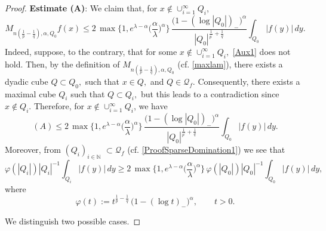 \documentclass[11pt, a4paper,leqno]{amsart}
\theoremstyle{plain}
\numberwithin{equation}{section}
\theoremstyle{definition}
\theoremstyle{remark}
\begin{document}
\begin{proof}
\vspace{2mm} \textbf{Estimate (A)}: We claim that, for $x\not \in \cup
_{i=1}^{\infty}Q_{i}$,
\begin{equation}
M_{n(\frac{1}{p}-\frac{1}{q}),\alpha,Q_{0}}f(x) \leq2\, \max\bigg\{1,
e^{\lambda- \alpha} \bigg(\frac{\alpha}{\lambda} \bigg)^{\alpha}\bigg\} \,
\frac{\big( 1 - (\log|Q_{0}|)_{-} \big)^{\alpha}}{|Q_{0}|^{\frac{1}{p^{\prime
}}+\frac{1}{q}}}\int_{Q_{0}}|f(y)|\,dy. \label{Aux1}%
\end{equation}
Indeed, suppose, to the contrary, that for some $x\not \in \cup_{i=1}^{\infty
}Q_{i},$ \eqref{Aux1} does not hold. Then, by the definition of $M_{n(\frac
{1}{p}-\frac{1}{q}),\alpha,Q_{0}}$ (cf. \eqref{maxlam}), there exists a dyadic
cube $Q\subset Q_{0},$ such that $x\in Q,$ and $Q\in\mathcal{Q}_{f}.$
Consequently, there exists a maximal cube $Q_{i}$ such that $Q\subset Q_{i},$
but this leads to a contradiction since $x\notin Q_{i}.$ Therefore, for
$x\not \in \cup_{i=1}^{\infty}Q_{i}$, we have
\begin{equation*}
(A)\leq2\, \max\bigg\{1, e^{\lambda- \alpha} \bigg(\frac{\alpha}{\lambda}
\bigg)^{\alpha}\bigg\} \, \frac{\big( 1 - (\log|Q_{0}|)_{-} \big)^{\alpha}%
}{|Q_{0}|^{\frac{1}{p^{\prime}}+\frac{1}{q}}}\int_{Q_{0}}|f(y)|\,dy.
\end{equation*}
Moreover, from $(Q_{i})_{i\in\mathbb{N}}$ $\subset\mathcal{Q}_{f}$ (cf.
\eqref{ProofSparseDomination1}) we see that%
\begin{equation}
\label{hshash}\varphi(|Q_{i}|)|Q_{i}|^{-1}\int_{Q_{i}}|f(y)|\,dy\geq2\,
\max\bigg\{1, e^{\lambda- \alpha} \bigg(\frac{\alpha}{\lambda} \bigg)^{\alpha
}\bigg\} \, \varphi(|Q_{0}|)|Q_{0}|^{-1}\int_{Q_{0}}|f(y)|\,dy,
\end{equation}
where
\[
\varphi(t) := t^{\frac{1}{p} -\frac{1}{q}} \, \big(1-(\log t)_{-}
\big)^{\alpha}, \qquad t > 0.
\]


We distinguish two possible cases.


\end{proof}
\end{document}
